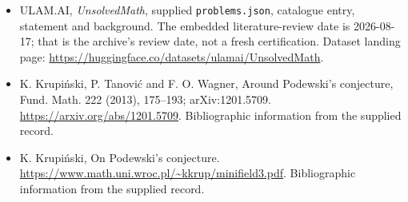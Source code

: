 \documentclass[11pt,a4paper]{article}
\begin{document}
{\small

\begin{itemize}

\item[\hypertarget{source:statement:1}{S1}] ULAM.AI, \emph{UnsolvedMath}, supplied \texttt{problems.json}, catalogue entry, statement and background. The embedded literature-review date is 2026-08-17; that is the archive’s review date, not a fresh certification. Dataset landing page: \url{https://huggingface.co/datasets/ulamai/UnsolvedMath}.

\item[\hypertarget{source:statement:2}{S2}] K. Krupiński, P. Tanović and F. O. Wagner, Around Podewski's conjecture, Fund. Math. 222 (2013), 175--193; arXiv:1201.5709. \url{https://arxiv.org/abs/1201.5709}. Bibliographic information from the supplied record.

\item[\hypertarget{source:statement:3}{S3}] K. Krupiński, On Podewski's conjecture. \url{https://www.math.uni.wroc.pl/~kkrup/minifield3.pdf}. Bibliographic information from the supplied record.

\end{itemize}

}

\label{end:statement}
\end{document}
